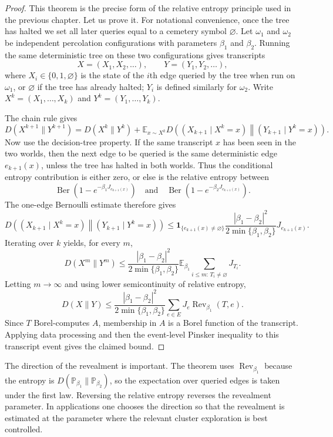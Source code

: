 \documentclass[11pt,reqno]{book}
\numberwithin{equation}{chapter}
\theoremstyle{plain}
\theoremstyle{definition}
\theoremstyle{remark}
\renewcommand{\P}{\mathbb P}
\newcommand{\E}{\mathbb E}
\newcommand{\1}{\mathbf 1}
\begin{document}
\begin{proof}
This theorem is the precise form of the relative entropy principle used in
the previous chapter. Let us prove it. For notational convenience, once the
tree has halted we set all later queries equal to a cemetery symbol
\(\varnothing\). Let \(\omega_1\) and \(\omega_2\) be independent
percolation configurations with parameters \(\beta_1\) and \(\beta_2\).
Running the same deterministic tree on these two configurations gives
transcripts
\[
  X=(X_1,X_2,\ldots),
  \qquad
  Y=(Y_1,Y_2,\ldots),
\]
where \(X_i\in\{0,1,\varnothing\}\) is the state of the \(i\)th edge queried
by the tree when run on \(\omega_1\), or \(\varnothing\) if the tree has
already halted; \(Y_i\) is defined similarly for \(\omega_2\). Write
\(X^k=(X_1,\ldots,X_k)\) and \(Y^k=(Y_1,\ldots,Y_k)\).

The chain rule gives
\[
  D(X^{k+1}\|Y^{k+1})
  =
  D(X^k\|Y^k)
  +
  \E_{x\sim X^k}
  D\!\left((X_{k+1}\mid X^k=x)\middle\|(Y_{k+1}\mid Y^k=x)\right).
\]
Now use the decision-tree property. If the same transcript \(x\) has been
seen in the two worlds, then the next edge to be queried is the same
deterministic edge \(e_{k+1}(x)\), unless the tree has halted in both worlds.
Thus the conditional entropy contribution is either zero, or else is the
relative entropy between
\[
  \operatorname{Ber}(1-e^{-\beta_1J_{e_{k+1}(x)}})
  \quad\text{and}\quad
  \operatorname{Ber}(1-e^{-\beta_2J_{e_{k+1}(x)}}).
\]
The one-edge Bernoulli estimate therefore gives
\[
  D\!\left((X_{k+1}\mid X^k=x)\middle\|(Y_{k+1}\mid Y^k=x)\right)
  \leq
  \1_{\{e_{k+1}(x)\neq\varnothing\}}
  \frac{|\beta_1-\beta_2|^2}{2\min\{\beta_1,\beta_2\}}
  J_{e_{k+1}(x)}.
\]
Iterating over \(k\) yields, for every \(m\),
\[
  D(X^m\|Y^m)
  \leq
  \frac{|\beta_1-\beta_2|^2}{2\min\{\beta_1,\beta_2\}}
  \E_{\beta_1}\sum_{i\leq m:\,T_i\neq\varnothing}J_{T_i}.
\]
Letting \(m\to\infty\) and using lower semicontinuity of relative entropy,
\[
  D(X\|Y)
  \leq
  \frac{|\beta_1-\beta_2|^2}{2\min\{\beta_1,\beta_2\}}
  \sum_{e\in E}J_e\operatorname{Rev}_{\beta_1}(T,e).
\]
Since \(T\) Borel-computes \(A\), membership in \(A\) is a Borel function of
the transcript. Applying data processing and then the event-level Pinsker
inequality to this transcript event gives the claimed bound.
\end{proof}

The direction of the revealment is important. The theorem uses \(\operatorname{Rev}_{\beta_1}\) because the entropy is \(D(\P_{\beta_1}\|\P_{\beta_2})\), so the expectation over queried edges is taken under the first law. Reversing the relative entropy reverses the revealment parameter. In applications one chooses the direction so that the revealment is estimated at the parameter where the relevant cluster exploration is best controlled.
\end{document}
